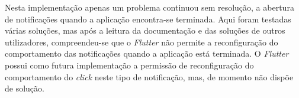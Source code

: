 Nesta implementação apenas um problema continuou sem resolução, a abertura de notificações quando a aplicação encontra-se terminada. Aqui foram testadas várias soluções, mas após a leitura da documentação e das soluções de outros utilizadores, compreendeu-se que o \textit{Flutter} não permite a reconfiguração do comportamento das notificações quando a aplicação está terminada. O \textit{Flutter} possui como futura implementação a permissão de reconfiguração do comportamento do \textit{click} neste tipo de notificação, mas, de momento não dispõe de solução.